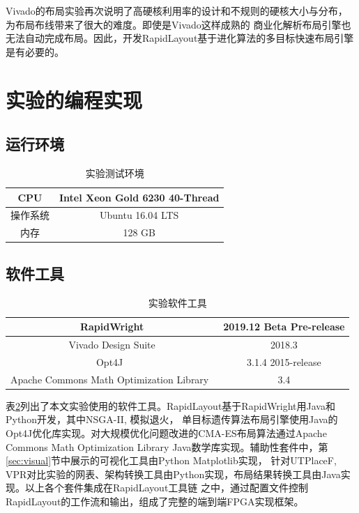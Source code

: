 Vivado的布局实验再次说明了高硬核利用率的设计和不规则的硬核大小与分布，为布局布线带来了很大的难度。即使是Vivado这样成熟的
商业化解析布局引擎也无法自动完成布局。因此，开发RapidLayout基于进化算法的多目标快速布局引擎是有必要的。




\section{实验的编程实现}


\subsection{运行环境}
\begin{table}[h]
	\centering
	\caption{实验测试环境}		
	\label{tab1}
	\begin{tabular}{c|c}
		\toprule[2pt]
        CPU & Intel Xeon Gold 6230 40-Thread\\
        \hline
		操作系统 & Ubuntu 16.04 LTS \\
		\hline                                        
		内存 	& 128 GB	\\
		\bottomrule[2pt]
	\end{tabular}
\end{table}

\subsection{软件工具}

\begin{table}[h]
	\centering
	\caption{实验软件工具}		
	\label{tab2}
	\begin{tabular}{c|c}
		\toprule[2pt]
		RapidWright 	& 2019.12 Beta Pre-release	\\
        \hline                                         
        Vivado Design Suite	&  2018.3 \\
        \hline
        Opt4J~\cite{opt4jpaper}  &  3.1.4 2015-release \\
        \hline
        Apache Commons Math Optimization Library~\cite{apache} & 3.4 \\
        \bottomrule[2pt]
	\end{tabular}
\end{table}

表\ref{tab2}列出了本文实验使用的软件工具。RapidLayout基于RapidWright用Java和Python开发，其中NSGA-II, 模拟退火，
单目标遗传算法布局引擎使用Java的Opt4J优化库实现。对大规模优化问题改进的CMA-ES布局算法通过Apache Commons 
Math Optimization Library Java数学库实现。辅助性套件中，第\ref{sec:visual}节中展示的可视化工具由Python Matplotlib实现，
针对UTPlaceF, VPR对比实验的网表、架构转换工具由Python实现，布局结果转换工具由Java实现。以上各个套件集成在RapidLayout工具链
之中，通过配置文件控制RapidLayout的工作流和输出，组成了完整的端到端FPGA实现框架。


